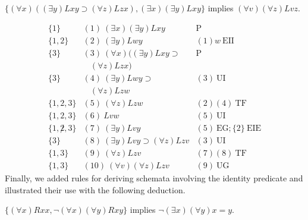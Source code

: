 \begin{center}
$\{(\forall x) ((\exists y) Lxy \supset (\forall z) Lzx), (\exists x)(\exists
y) Lxy \}$ implies $(\forall v)(\forall z) Lvz.$
\end{center}
\[
\begin{array}{lll}
\{1\}   & (1)\  (\exists x)(\exists y) Lxy &  \mathrm{P}\\
\{1,2\}   & (2)\ (\exists y) Lwy  & (1)w\ \mathrm{EII}\\
\{3\}   & (3)\ (\forall x) ((\exists y) Lxy \supset   & 
\mathrm{P}\\
  &\ \ \ \  (\forall z) Lzx)  & \\
\{3\}   & (4)\ (\exists y) Lwy \supset   & (3)\ \mathrm{UI}\\
  &\ \ \ \ (\forall z) Lzw & \\
\{1,2,3\}   & (5)\ (\forall z) Lzw  & (2)(4)\ \mathrm{TF}\\
\{1,2,3\}   & (6)\ Lvw  & (5)\ \mathrm{UI}\\
\{1,\not 2,3\}   & (7)\ (\exists y) Lvy  & (5)\ \mathrm{EG};\{2\}\
\mathrm{EIE}\\ 
\{3\}   & (8)\ (\exists y) Lvy \supset (\forall z) Lzv  & (3)\ \mathrm{UI}\\
\{1,3\}   & (9)\  (\forall z) Lzv & (7)(8)\ \mathrm{TF}\\
\{1,3\}   & (10)\  (\forall v)(\forall z) Lzv & (9)\ \mathrm{UG}
\end{array}
\]
\newpage
Finally, we added rules for deriving schemata involving the identity predicate and illustrated their use with the following deduction.
\begin{center}
$\{(\forall x) Rxx, \neg (\forall x)(\forall y) Rxy \}$
implies $\neg (\exists x)(\forall y) x = y$.
\end{center}
